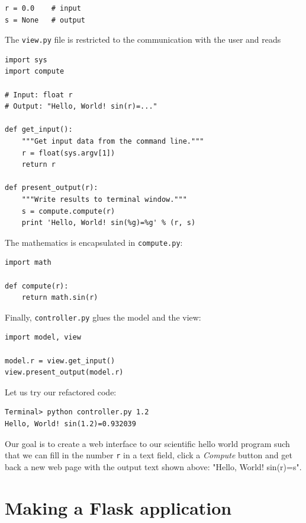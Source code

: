 \documentclass[%
oneside,                 %
final,                   %
10pt]{article}
\begin{document}
\begin{Verbatim}[numbers=none,fontsize=\fontsize{9pt}{9pt},baselinestretch=0.85]
r = 0.0    # input
s = None   # output
\end{Verbatim}

The \Verb!view.py! file is restricted to the communication with the user and reads

\begin{Verbatim}[numbers=none,fontsize=\fontsize{9pt}{9pt},baselinestretch=0.85]
import sys
import compute

# Input: float r
# Output: "Hello, World! sin(r)=..."

def get_input():
    """Get input data from the command line."""
    r = float(sys.argv[1])
    return r

def present_output(r):
    """Write results to terminal window."""
    s = compute.compute(r)
    print 'Hello, World! sin(%g)=%g' % (r, s)
\end{Verbatim}

The mathematics is encapsulated in \Verb!compute.py!:

\begin{Verbatim}[numbers=none,fontsize=\fontsize{9pt}{9pt},baselinestretch=0.85]
import math

def compute(r):
    return math.sin(r)
\end{Verbatim}

Finally, \Verb!controller.py! glues the model and the view:

\begin{Verbatim}[numbers=none,fontsize=\fontsize{9pt}{9pt},baselinestretch=0.85]
import model, view

model.r = view.get_input()
view.present_output(model.r)
\end{Verbatim}

Let us try our refactored code:

\begin{Verbatim}[numbers=none,fontsize=\fontsize{9pt}{9pt},baselinestretch=0.85]
Terminal> python controller.py 1.2
Hello, World! sin(1.2)=0.932039
\end{Verbatim}

Our goal is to create a web interface to our scientific hello world
program such that we can fill in the number \Verb!r! in a text field, click a
\emph{Compute} button and get back a new web page with the output text
shown above: "Hello, World! sin(r)=s".

\section{Making a Flask application}
\end{document}
